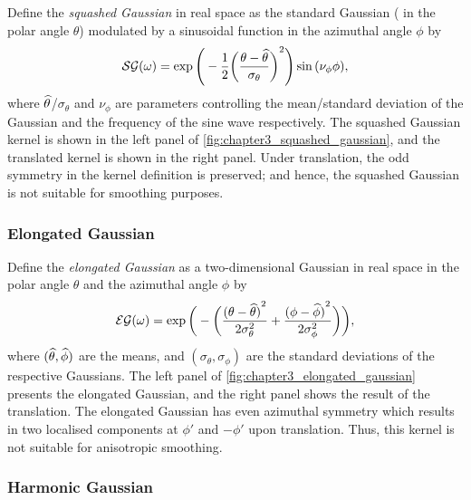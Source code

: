 Define the \emph{squashed Gaussian} in real space as the standard Gaussian (\ie{} in the polar angle \(\theta{}\)) modulated by a sinusoidal function in the azimuthal angle \(\phi{}\) by
%
\begin{equation}
	\mathcal{SG}(\omega)
	= \exp\Bigg(-\frac{1}{2}{\bigg(\frac{\theta-\widehat{\theta}}{\sigma_{\theta}}\bigg)}^{2}\Bigg)
	\sin{(\nu_{\phi}\phi)},
\end{equation}
%
where \(\widehat{\theta}\)/\(\sigma_{\theta}\) and \(\nu_{\phi}\) are parameters controlling the mean/standard deviation of the Gaussian and the frequency of the sine wave respectively.
The squashed Gaussian kernel is shown in the left panel of \cref{fig:chapter3_squashed_gaussian}, and the translated kernel is shown in the right panel.
Under translation, the odd symmetry in the kernel definition is preserved; and hence, the squashed Gaussian is not suitable for smoothing purposes.



\subsubsection{Elongated Gaussian}

Define the \emph{elongated Gaussian} as a two-dimensional Gaussian in real space in the polar angle \(\theta{}\) and the azimuthal angle \(\phi{}\) by
%
\begin{equation}
	\mathcal{EG}(\omega)
	= \exp\bigg(-\bigg(\frac{{(\theta-\widehat{\theta})}^{2}}{2\sigma_{\theta}^{2}}
		+ \frac{{(\phi-\widehat{\phi})}^{2}}{2\sigma_{\phi}^{2}}\bigg)\bigg),
\end{equation}
%
where \((\widehat{\theta},\widehat{\phi})\) are the means, and \((\sigma_{\theta},\sigma_{\phi})\) are the standard deviations of the respective Gaussians.
The left panel of \cref{fig:chapter3_elongated_gaussian} presents the elongated Gaussian, and the right panel shows the result of the translation.
The elongated Gaussian has even azimuthal symmetry which results in two localised components at \(\phi'\) and \(-\phi'\) upon translation.
Thus, this kernel is not suitable for anisotropic smoothing.



\subsubsection{Harmonic Gaussian}

